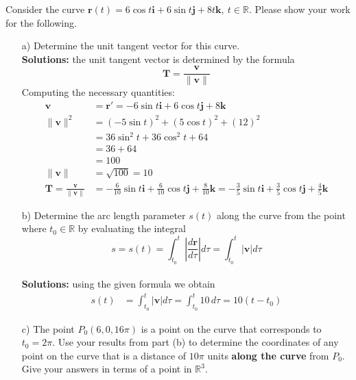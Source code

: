 \ifnum {}
    \question[6] Consider the curve $\mathbf r(t) = 6\cos t \mathbf i + 6 \sin t \mathbf j + 8t\mathbf k, \ t \in \mathbb R$. Please show your work for the following. 
    \begin{enumerate}
        \item[a)] Determine the unit tangent vector for this curve. 
            \ifnum {} {\color{DarkBlue} \\[12pt] 
            \textbf{Solutions:} the unit tangent vector is determined by the formula
            $$\mathbf T = \frac{\mathbf v}{\| \mathbf v \|}$$
            Computing the necessary quantities:
            \begin{align}
                \mathbf v &= \mathbf r '  = -6\sin t \mathbf i + 6 \cos t \mathbf j + 8\mathbf k\\
                \|\mathbf v \|^2 &= (-5\sin t)^2 + (5 \cos t)^2 + (12)^2 \\ 
                &= 36\sin^2t + 36\cos^2t + 64 \\
                &= 36+64 \\
                &= 100 \\
                \|\mathbf v \| &= \sqrt{100} = 10 \\
                \mathbf T = \frac{\mathbf v}{\| \mathbf v \|} & = -\frac{6}{10}\sin t \mathbf i + \frac{6}{10} \cos t \mathbf j + \frac{8}{10}\mathbf k = -\frac{3}{5}\sin t \mathbf i + \frac{3}{5} \cos t \mathbf j + \frac{4}{5}\mathbf k
            \end{align}
            } 
            \else 
            \vspace{7cm}
            \fi        
        \item[b)] Determine the arc length parameter $s(t)$ along the curve from the point where $t_0 \in \mathbb R$ by evaluating the integral $$s = s(t) = \int_{t_0}^{t} \left | \frac{d\mathbf r}{d \tau} \right | d \tau 
        = \int_{t_0}^{t} \left | \mathbf v \right | d \tau$$
        \ifnum {} {\color{DarkBlue} \\[12pt] 
        \textbf{Solutions:} using the given formula we obtain
            \begin{align}
                s(t) &= \int_{t_0}^{t} \left | \mathbf v \right | d\tau 
                = \int_{t_0}^{t}   10  \, d \tau
                = 10 (t - t_0) 
            \end{align}
        } 
        \else 
        \vspace{3cm}
        \fi        
        \item[c)] The point $P_0(6,0,16\pi)$ is a point on the curve that corresponds to $t_0=2\pi$. Use your results from part (b) to determine the coordinates of any point on the curve that is a distance of $10\pi$ units \textbf{along the curve} from $P_0$. Give your answers in terms of a point in $\mathbb R^3$. 

\end{enumerate}
